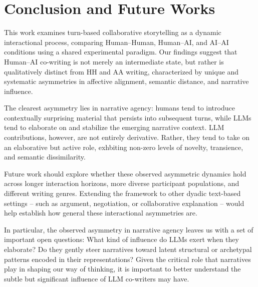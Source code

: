 \documentclass[11pt]{article}
\begin{document}
\section{Conclusion and Future Works}

This work examines turn-based collaborative storytelling as a dynamic interactional process, comparing Human–Human, Human–AI, and AI–AI conditions using a shared experimental paradigm.  Our findings suggest that Human–AI co-writing is not merely an intermediate state, but rather is qualitatively distinct from HH and AA writing, characterized by unique and systematic asymmetries in affective alignment, semantic distance, and narrative influence. 

The clearest asymmetry lies in narrative agency: humans tend to introduce contextually surprising material that persists into subsequent turns, while LLMs tend to elaborate on and stabilize the emerging narrative context. LLM contributions, however, are not entirely derivative. Rather, they tend to take on an elaborative but active role, exhbiting non-zero levels of novelty, transience, and semantic dissimilarity.  

Future work should explore whether these observed asymmetric dynamics hold across longer interaction horizons, more diverse participant populations, and different writing genres. Extending the framework to other dyadic text-based settings -- such as argument, negotiation, or collaborative explanation -- would help establish how general these interactional asymmetries are.  

In particular, the observed asymmetry in narrative agency leaves us with a set of important open questions: What kind of influence do LLMs exert when they elaborate? Do they gently steer narratives toward latent structural or archetypal patterns encoded in their representations? Given the critical role that narratives play in shaping our way of thinking, it is important to better understand the subtle but significant influence of LLM co-writers may have.  



\end{document}
